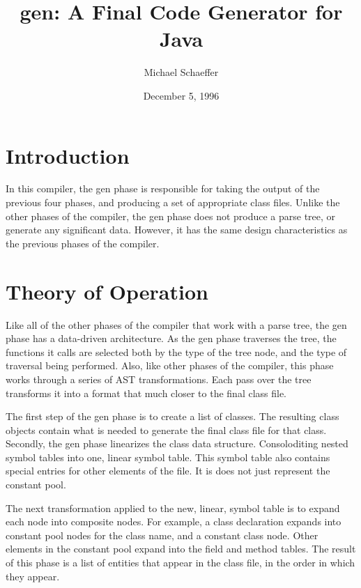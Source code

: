 \documentclass{article}[1994/05/24]
\title{gen: A Final Code Generator for Java}
\author{Michael Schaeffer}
\date{December 5, 1996}
\begin{document}
\maketitle


\section{Introduction}

	In this compiler, the gen phase is responsible for taking
the output of the previous four phases, and producing a set of
appropriate class files.  Unlike the other phases of the compiler,
the gen phase does not produce a parse tree, or generate any significant
data.  However, it has the same design characteristics as the previous
phases of the compiler.

\section{Theory of Operation}

	Like all of the other phases of the compiler that work with
a parse tree, the gen phase has a data-driven architecture.  As
the gen phase traverses the tree, the functions it calls are selected
both by the type of the tree node, and the type of traversal being
performed.  Also, like other phases of the compiler, this phase works
through a series of AST transformations.  Each pass over the tree
transforms it into a format that much closer to the final class file.

	The first step of the gen phase is to create a list of classes.
The resulting class objects contain what is needed to generate the final
class file for that class. Secondly, the gen phase linearizes the class data
structure.  Consoloditing nested symbol tables into one, linear symbol
table.  This symbol table also contains special entries for other elements
of the file.  It is does not just represent the constant pool.

	The next transformation applied to the new, linear, symbol
table is to expand each node into composite nodes.  For example, a
class declaration expands into constant pool nodes for the class
name, and a constant class node.  Other elements in the constant pool
expand into the field and method tables. The result of this phase is a
list of entities that appear in the class file, in the order in which
they appear.
\end{document}
